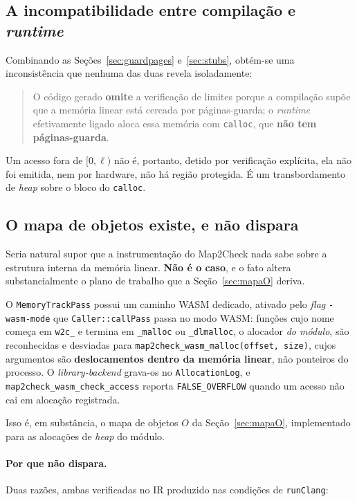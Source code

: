 \documentclass[11pt,a4paper]{article}
\theoremstyle{definition}
\newcommand{\code}[1]{\texttt{#1}}
\begin{document}
\subsection{A incompatibilidade entre compilação e \emph{runtime}}
\label{sec:mismatch}

Combinando as Seções~\ref{sec:guardpages} e~\ref{sec:stubs}, obtém-se uma
inconsistência que nenhuma das duas revela isoladamente:

\begin{quote}
O código gerado \textbf{omite} a verificação de limites porque a compilação supõe
que a memória linear está cercada por páginas-guarda; o \emph{runtime}
efetivamente ligado aloca essa memória com \code{calloc}, que \textbf{não tem
páginas-guarda}.
\end{quote}

Um acesso fora de $[0,\ell)$ não é, portanto, detido por verificação explícita,
ela não foi emitida, nem por hardware, não há região protegida. É um
transbordamento de \emph{heap} sobre o bloco do \code{calloc}.

\subsection{O mapa de objetos existe, e não dispara}
\label{sec:mortocodigo}

Seria natural supor que a instrumentação do Map2Check nada sabe sobre a estrutura
interna da memória linear. \textbf{Não é o caso}, e o fato altera
substancialmente o plano de trabalho que a Seção~\ref{sec:mapaO} deriva.

O \code{MemoryTrackPass} possui um caminho WASM dedicado, ativado pelo
\emph{flag} \code{-wasm-mode} que \code{Caller::callPass} passa no modo WASM:
funções cujo nome começa em \code{w2c\_} e termina em \code{\_malloc} ou
\code{\_dlmalloc}, o alocador \emph{do módulo}, são reconhecidas e
desviadas para \code{map2check\_wasm\_malloc(offset, size)}, cujos argumentos são
\textbf{deslocamentos dentro da memória linear}, não ponteiros do processo. O
\emph{library-backend} grava-os no \code{AllocationLog}, e
\code{map2check\_wasm\_check\_access} reporta \code{FALSE\_OVERFLOW} quando um
acesso não cai em alocação registrada.

Isso é, em substância, o mapa de objetos $O$ da Seção~\ref{sec:mapaO},
implementado para as alocações de \emph{heap} do módulo.

\paragraph{Por que não dispara.}
Duas razões, ambas verificadas no IR produzido nas condições de
\code{runClang}:
\end{document}
